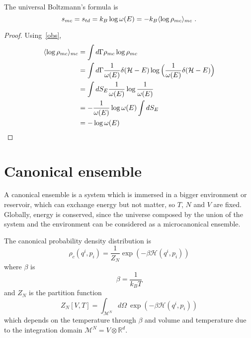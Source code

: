     The universal Boltzmann's formula is 
    \begin{equation}\label{unboltz}
        s_{mc} = s_{td} = k_B \log \omega(E) = - k_B \langle\log \rho_{mc}\rangle_{mc} ~.
    \end{equation}

    \begin{proof}
        
    Using~\eqref{obs}, 
    \begin{equation*}
    \begin{aligned}
        \langle\log \rho_{mc}\rangle_{mc} & = \int d\Gamma \rho_{mc} \log \rho_{mc} \\ & = \int d\Gamma \frac{1}{\omega(E)} \delta (\mathcal H - E) \log \Big ( \frac{1}{\omega(E)} \delta (\mathcal H - E) \Big) \\ & = \int dS_E \frac{1}{\omega(E)} \log \frac{1}{\omega(E)} \\ & = - \frac{1}{\omega(E)} \log \omega(E) \int dS_E \\ & = - \log \omega (E)
    \end{aligned}
    \end{equation*}
    \end{proof}

\chapter{Canonical ensemble}

    A canonical ensemble is a system which is immersed in a bigger environment or reservoir, which can exchange energy but not matter, so $T$, $N$ and $V$ are fixed. Globally, energy is conserved, since the universe composed by the union of the system and the environment can be considered as a microcanonical ensemble. 

    The canonical probability density distribution is 
    \begin{equation*}
        \rho_c (q^i, p_i) = \frac{1}{Z_N} \exp (-\beta \mathcal H(q^i, p_i))
    \end{equation*}
    where $\beta$ is 
    \begin{equation*}
        \beta = \frac{1}{k_B T}
    \end{equation*}
    and $Z_N$ is the partition function 
    \begin{equation}
        Z_N[V, T] = \int_{\mathcal M^N} d\Omega ~\exp (-\beta \mathcal H(q^i, p_i))
    \end{equation}
    which depends on the temperature through $\beta$ and volume and temperature due to the integration domain $\mathcal M^N = V \otimes \mathbb R^d$.

